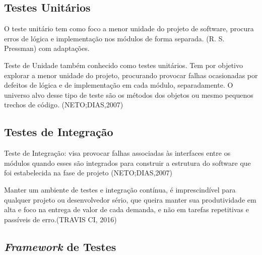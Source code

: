     \subsection{Testes Unitários}
        O teste unitário tem como foco a menor unidade do projeto de software, procura erros de lógica e implementação nos módulos de forma separada. (R. S. Pressman) com adaptações.

         Teste de Unidade também conhecido como testes unitários. Tem por objetivo explorar a menor unidade do projeto, procurando provocar falhas ocasionadas por defeitos de lógica e de implementação em cada módulo, separadamente. O universo alvo desse tipo de teste são os métodos dos objetos ou mesmo pequenos trechos de código. (NETO;DIAS,2007)
        
        

    \subsection{Testes de Integração}

        Teste de Integração: visa provocar falhas associadas às interfaces entre os módulos quando esses são integrados para construir a estrutura do software que foi estabelecida na fase de projeto 
        (NETO;DIAS,2007)

        Manter um ambiente de testes e integração contínua, é imprescindível para qualquer projeto ou desenvolvedor sério, que queira manter sua produtividade em alta e foco na entrega de valor de cada demanda, e não em tarefas repetitivas e passíveis de erro.(TRAVIS CI, 2016)


    \subsection{\textit{Framework} de Testes}
        
